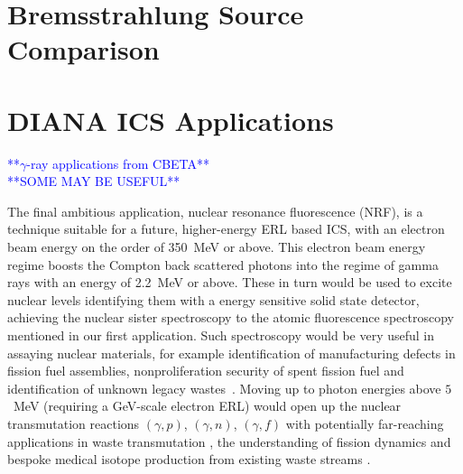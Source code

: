 \documentclass[../main.tex]{subfiles}
\begin{document}
\section{Bremsstrahlung Source Comparison}

\section{DIANA ICS Applications}
\textcolor{blue}{**$\gamma$-ray applications from CBETA** \\ **SOME MAY BE USEFUL**}

The final ambitious application, nuclear resonance fluorescence (NRF), is a technique suitable for a future, higher-energy ERL based ICS, with an electron beam energy on the order of 350~\si{\mega\electronvolt} or above. This electron beam energy regime boosts the Compton back scattered photons into the regime of gamma rays with an energy of 2.2~\si{\mega\electronvolt} or above. These in turn would be used to excite nuclear levels identifying them with a energy sensitive solid state detector, achieving the nuclear sister spectroscopy to the atomic fluorescence spectroscopy mentioned in our first application. Such spectroscopy would be very useful in assaying nuclear materials, for example identification of manufacturing defects in fission fuel assemblies, nonproliferation security of spent fission fuel and identification of unknown legacy wastes~\cite{angal2018perle,angell2015demonstration,bolind2015states,geddes2017impact,kwan2011discrete}. Moving up to photon energies above $5$~\si{\mega\electronvolt} (requiring a \si{\giga\electronvolt}-scale electron ERL) would open up the nuclear transmutation reactions $(\gamma,p)$, $(\gamma,n)$, $(\gamma,f)$ with potentially far-reaching applications in waste transmutation \cite{ur2017optimization}, the understanding of fission dynamics \cite{bellia1983towards,bhike2017exploratory,finch2018monoenergetic} and bespoke medical isotope production from existing waste streams \cite{habs2011production}. 
\end{document}
